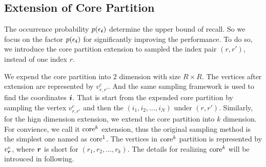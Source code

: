 \documentclass[letterpaper]{article}
\newcommand{\V}[1]{{\boldsymbol{{\MakeLowercase{#1}}}}}
\newcommand{\coord}{(i_1,i_2,\ldots,i_N)}
\begin{document}
\subsection{Extension of Core Partition}
The occurrence probability $p(\epsilon_{\V{i}})$ determine the upper bound of recall.
So we focus on the factor $p(\epsilon_{\V{i}})$ for significantly improving the performance.
To do so, we introduce the core partition extension to sampled the index pair $(r,r')$,
instead of one index $r$.

We expend the core partition into $2$ dimension with size $R\times R$.
The vertices after extension are represented by $v^c_{r,r'}$.
And the same sampling framework is used to find the coordinates $\V{i}$.
That is start from the expended core partition by sampling the vertex $v^c_{r,r'}$
and then the $\coord$ under $(r,r')$.
Similarly, for the hign dimension extension,
we extend the core partition into $k$ dimension.
For convience, we call it ${\rm core}^k$ extension,
thus the original sampling method is the simplest one named as ${\rm core}^1$.
The vertices in ${\rm core}^k$ partition is represented by $v^c_{\V{r}}$,
where $\V{r}$ is short for $(r_1,r_2,\ldots,r_k)$.
The details for realizing ${\rm core}^k$ will be introuced in following.
\end{document}
